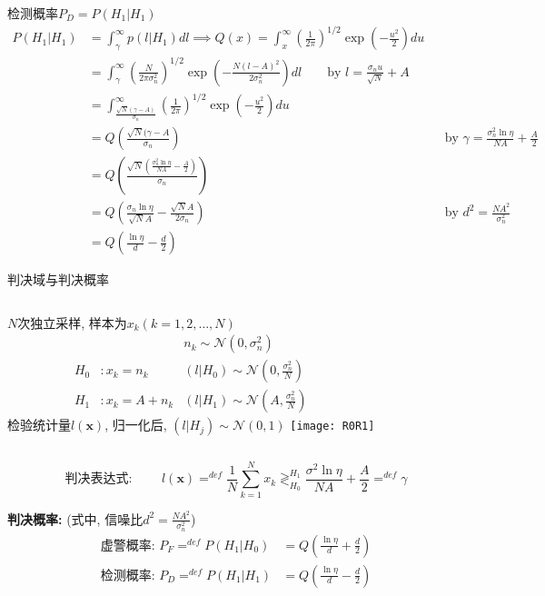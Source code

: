\begin{frame}[shrink]{检测概率$P_D=P(H_1|H_1)$}
\begin{align*}
P(H_1|H_1)&=\int_{\gamma}^{\infty}p(l|H_1)dl\implies Q(x)=\int_{x}^{\infty}\left(\frac{1}{2\pi}\right)^{1/2}\exp\left(-\frac{u^2}{2}\right)du\\
&=\int_{\gamma}^{\infty}\left(\frac{N}{2\pi\sigma_n^2}\right)^{1/2}\exp\left(-\frac{N(l-A)^2}{2\sigma_n^2}\right)dl\qquad \text{by } l=\frac{\sigma_nu}{\sqrt{N}}+A\\
&=\int_{\frac{\sqrt{N}(\gamma-A)}{\sigma_n}}^{\infty}\left(\frac{1}{2\pi}\right)^{1/2}\exp\left(-\frac{u^2}{2}\right)du\\
&=Q\left(\frac{\sqrt{N}(\gamma-A}{\sigma_n}\right) &&\text{by } \gamma=\frac{\sigma_n^2\ln\eta}{NA}+\frac{A}{2}\\
&=Q\left(\frac{\sqrt{N}\left(\frac{\sigma_n^2\ln\eta}{NA}-\frac{A}{2}\right)}{\sigma_n}\right)\\
&=Q\left(\frac{\sigma_n\ln\eta}{\sqrt{N}A}-\frac{\sqrt{N}A}{2\sigma_n}\right)&& \text{by }d^2=\frac{NA^2}{\sigma_n^2}\\
&=Q\left(\frac{\ln\eta}{d}-\frac{d}{2}\right)
\end{align*}
\end{frame}

\begin{frame}[shrink]{判决域与判决概率}
\begin{columns}
$N$次独立采样, 样本为$x_k(k=1,2,\dots,N)$
\begin{align*}
&&n_k\sim\mathcal{N}(0,\sigma_n^2)\\ 
H_0 &:x_k=n_k   &(l|H_0)\sim\mathcal{N}(0,\frac{\sigma_n^2}{N})\\
H_1 &:x_k=A+n_k &(l|H_1)\sim\mathcal{N}(A,\frac{\sigma_n^2}{N})
\end{align*}
检验统计量$l(\bm{x})$, 归一化后, $(l|H_j)\sim\mathcal{N}(0,1)$
\texttt{[image: R0R1]}\\
\end{columns}
\[
\textbf{判决表达式: }\qquad l(\bm{x})\mathop{=}^{def}\frac{1}{N}\sum\limits_{k=1}^Nx_k\mathop{\gtrless}_{H_0}^{H_1}\frac{\sigma^2\ln\eta}{NA}+\frac{A}{2}\mathop{=}^{def}\gamma
\]

\textbf{判决概率:} (式中, 信噪比$d^2=\frac{NA^2}{\sigma_n^2}$)
\begin{align*}
\textbf{虚警概率: }P_F\mathop{=}^{def}P(H_1|H_0)&=Q\left(\frac{\ln\eta}{d}+\frac{d}{2}\right)\\
\textbf{检测概率: }P_D\mathop{=}^{def}P(H_1|H_1)&=Q\left(\frac{\ln\eta}{d}-\frac{d}{2}\right)
\end{align*}
\end{frame}

